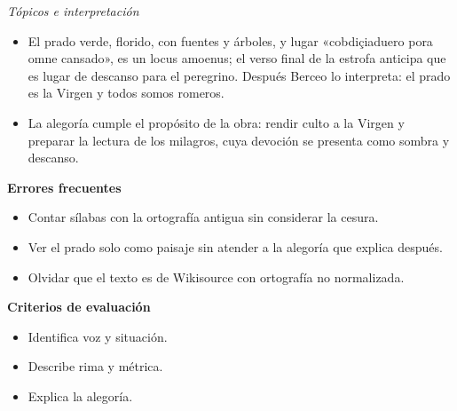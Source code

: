\documentclass{book}
\begin{document}
\begin{tcolorbox}[title={Ejercicio resuelto}, studiumworked, breakable]
\noindent\textit{Tópicos e interpretación}
\begin{itemize}
\item El prado verde, florido, con fuentes y árboles, y lugar «cobdiçiaduero pora omne cansado», es un locus amoenus; el verso final de la estrofa anticipa que es lugar de descanso para el peregrino. Después Berceo lo interpreta: el prado es la Virgen y todos somos romeros.
\item La alegoría cumple el propósito de la obra: rendir culto a la Virgen y preparar la lectura de los milagros, cuya devoción se presenta como sombra y descanso.
\end{itemize}

\noindent\textbf{Errores frecuentes}
\begin{itemize}
\item Contar sílabas con la ortografía antigua sin considerar la cesura.
\item Ver el prado solo como paisaje sin atender a la alegoría que explica después.
\item Olvidar que el texto es de Wikisource con ortografía no normalizada.
\end{itemize}

\noindent\textbf{Criterios de evaluación}
\begin{itemize}
\item Identifica voz y situación.
\item Describe rima y métrica.
\item Explica la alegoría.
\end{itemize}
\end{tcolorbox}
\end{document}
